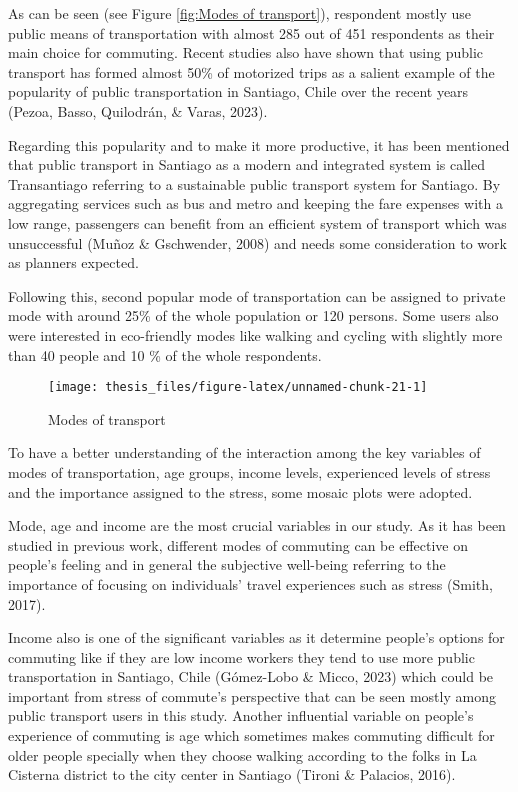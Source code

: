 \documentclass[
11pt, %
oneside, %
english, %
singlespacing, %
]{macthesis} %
\begin{document}
As can be seen (see Figure \ref{fig:Modes of transport}), respondent mostly use public means of transportation with almost 285 out of 451 respondents as their main choice for commuting. Recent studies also have shown that using public transport has formed almost 50\% of motorized trips as a salient example of the popularity of public transportation in Santiago, Chile over the recent years (Pezoa, Basso, Quilodrán, \& Varas, 2023).

Regarding this popularity and to make it more productive, it has been mentioned that public transport in Santiago as a modern and integrated system is called Transantiago referring to a sustainable public transport system for Santiago. By aggregating services such as bus and metro and keeping the fare expenses with a low range, passengers can benefit from an efficient system of transport which was unsuccessful (Muñoz \& Gschwender, 2008) and needs some consideration to work as planners expected.

Following this, second popular mode of transportation can be assigned to private mode with around 25\% of the whole population or 120 persons. Some users also were interested in eco-friendly modes like walking and cycling with slightly more than 40 people and 10 \% of the whole respondents.
\begin{figure}

{\centering \texttt{[image: thesis\_files/figure-latex/unnamed-chunk-21-1]} 

}

\caption{\label{fig:Modes of transport}Modes of transport}\label{fig:unnamed-chunk-21}
\end{figure}
To have a better understanding of the interaction among the key variables of modes of transportation, age groups, income levels, experienced levels of stress and the importance assigned to the stress, some mosaic plots were adopted.

Mode, age and income are the most crucial variables in our study. As it has been studied in previous work, different modes of commuting can be effective on people's feeling and in general the subjective well-being referring to the importance of focusing on individuals' travel experiences such as stress (Smith, 2017).

Income also is one of the significant variables as it determine people's options for commuting like if they are low income workers they tend to use more public transportation in Santiago, Chile (Gómez-Lobo \& Micco, 2023) which could be important from stress of commute's perspective that can be seen mostly among public transport users in this study. Another influential variable on people's experience of commuting is age which sometimes makes commuting difficult for older people specially when they choose walking according to the folks in La Cisterna district to the city center in Santiago (Tironi \& Palacios, 2016).
\end{document}

